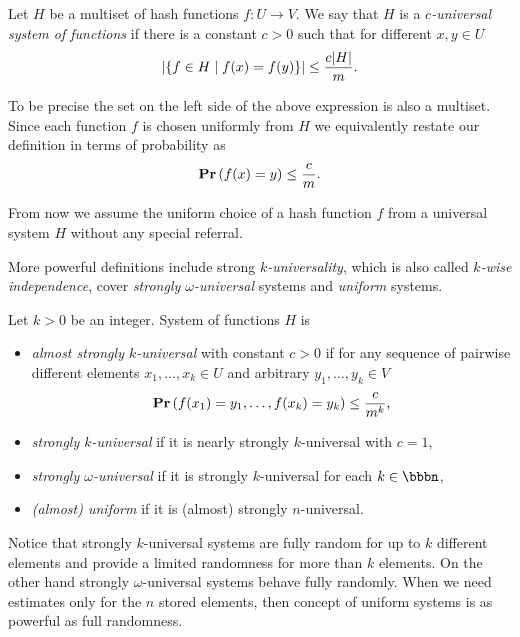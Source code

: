 \begin{definition}
\label{definition-c-universal-system}
Let $H$ be a multiset of hash functions $f\colon U \rightarrow V$. We say that $H$ is a \emph{$c$-universal system of functions} if there is a constant $c > 0$ such that for different $x, y \in U$
\[
\left|\lbrace f \in H \mid f(x) = f(y) \rbrace\right| \leq \frac{c|H|}{m}.
\]
\end{definition}

To be precise the set on the left side of the above expression is also a multiset. Since each function $f$ is chosen uniformly from $H$ we equivalently restate our definition in terms of probability as
\[
\mathbf{Pr}\left(f(x) = y\right) \leq \frac{c}{m}.
\]

From now we assume the uniform choice of a hash function $f$ from a universal system $H$ without any special referral.

More powerful definitions include strong \emph{$k$-universality}, which is also called \emph{$k$-wise independence}, cover \emph{strongly $\omega$-universal} systems and \emph{uniform} systems.
\begin{definition}
Let $k > 0$ be an integer. System of functions $H$ is 
\begin{itemize}
	\item \emph{almost strongly $k$-universal} with constant $c > 0$ if for any sequence of pairwise different elements $x_1, \dots, x_k \in U$ and arbitrary $y_1, \dots, y_k \in V$ \[\mathbf{Pr}\left(f(x_1) = y_1, \dots, f(x_k) = y_k\right) \leq \frac{c}{m^k}\mbox{,}\]
	\item \emph{strongly $k$-universal} \cite{DBLP:conf/focs/WegmanC79} if it is nearly strongly $k$-universal with $c = 1$,
	\item \emph{strongly $\omega$-universal} \cite{DBLP:conf/focs/WegmanC79} if it is strongly $k$-universal for each $k \in \bbbn$,
	\item \emph{(almost) uniform} \cite{DBLP:journals/siamcomp/PaghP08} if it is (almost) strongly $n$-universal.
\end{itemize}
\end{definition}

Notice that strongly $k$-universal systems are fully random for up to $k$ different elements and provide a limited randomness for more than $k$ elements. On the other hand strongly $\omega$-universal systems behave fully randomly. When we need estimates only for the $n$ stored elements, then concept of uniform systems is as powerful as full randomness.
